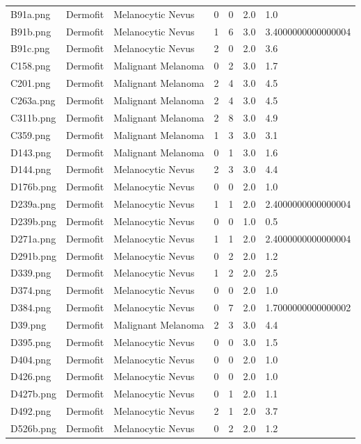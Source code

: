 \begin{longtable}{ | l | l | l | l | l | l | l |}
B91a.png & Dermofit & Melanocytic Nevus & 0 & 0 & 2.0 & 1.0 \\
B91b.png & Dermofit & Melanocytic Nevus & 1 & 6 & 3.0 & 3.4000000000000004 \\
B91c.png & Dermofit & Melanocytic Nevus & 2 & 0 & 2.0 & 3.6 \\
C158.png & Dermofit & Malignant Melanoma & 0 & 2 & 3.0 & 1.7 \\
C201.png & Dermofit & Malignant Melanoma & 2 & 4 & 3.0 & 4.5 \\
C263a.png & Dermofit & Malignant Melanoma & 2 & 4 & 3.0 & 4.5 \\
C311b.png & Dermofit & Malignant Melanoma & 2 & 8 & 3.0 & 4.9 \\
C359.png & Dermofit & Malignant Melanoma & 1 & 3 & 3.0 & 3.1 \\
D143.png & Dermofit & Malignant Melanoma & 0 & 1 & 3.0 & 1.6 \\
D144.png & Dermofit & Melanocytic Nevus & 2 & 3 & 3.0 & 4.4 \\
D176b.png & Dermofit & Melanocytic Nevus & 0 & 0 & 2.0 & 1.0 \\
D239a.png & Dermofit & Melanocytic Nevus & 1 & 1 & 2.0 & 2.4000000000000004 \\
D239b.png & Dermofit & Melanocytic Nevus & 0 & 0 & 1.0 & 0.5 \\
D271a.png & Dermofit & Melanocytic Nevus & 1 & 1 & 2.0 & 2.4000000000000004 \\
D291b.png & Dermofit & Melanocytic Nevus & 0 & 2 & 2.0 & 1.2 \\
D339.png & Dermofit & Melanocytic Nevus & 1 & 2 & 2.0 & 2.5 \\
D374.png & Dermofit & Melanocytic Nevus & 0 & 0 & 2.0 & 1.0 \\
D384.png & Dermofit & Melanocytic Nevus & 0 & 7 & 2.0 & 1.7000000000000002 \\
D39.png & Dermofit & Malignant Melanoma & 2 & 3 & 3.0 & 4.4 \\
D395.png & Dermofit & Melanocytic Nevus & 0 & 0 & 3.0 & 1.5 \\
D404.png & Dermofit & Melanocytic Nevus & 0 & 0 & 2.0 & 1.0 \\
D426.png & Dermofit & Melanocytic Nevus & 0 & 0 & 2.0 & 1.0 \\
D427b.png & Dermofit & Melanocytic Nevus & 0 & 1 & 2.0 & 1.1 \\
D492.png & Dermofit & Melanocytic Nevus & 2 & 1 & 2.0 & 3.7 \\
D526b.png & Dermofit & Melanocytic Nevus & 0 & 2 & 2.0 & 1.2 \\

\end{longtable}
